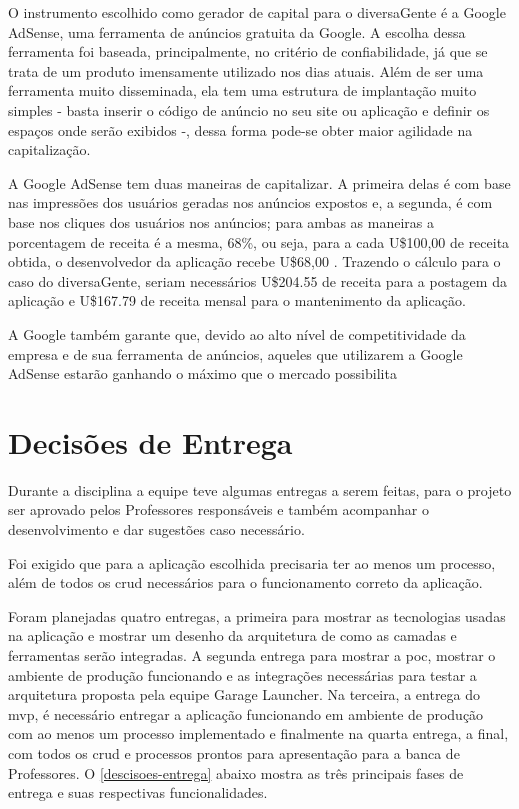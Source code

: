 O instrumento escolhido como gerador de capital para o diversaGente é a Google AdSense, uma ferramenta de anúncios gratuita da Google. A escolha dessa ferramenta foi baseada, principalmente, no critério de confiabilidade, já que se trata de um produto imensamente utilizado nos dias atuais. Além de ser uma ferramenta muito disseminada, ela tem uma estrutura de implantação muito simples - basta inserir o código de anúncio no seu site ou aplicação e definir os espaços onde serão exibidos -, dessa forma pode-se obter maior agilidade na capitalização.




A Google AdSense tem duas maneiras de capitalizar. A primeira delas é com base nas impressões dos usuários geradas nos anúncios expostos e, a segunda, é com base nos cliques dos usuários nos anúncios; para ambas as maneiras a porcentagem de receita é a mesma, 68\%, ou seja, para a cada U\$100,00 de receita obtida, o desenvolvedor da aplicação recebe U\$68,00  \cite{googleadsense}. Trazendo o cálculo para o caso do diversaGente, seriam necessários U\$204.55 de receita para a postagem da aplicação e U\$167.79 de receita mensal para o mantenimento da aplicação.

A Google também garante que, devido ao alto nível de competitividade da empresa e de sua ferramenta de anúncios, aqueles que utilizarem a Google AdSense estarão ganhando o máximo que o mercado possibilita


\section{Decisões de Entrega}

Durante a disciplina a equipe teve algumas entregas a serem feitas, para o projeto ser aprovado pelos Professores responsáveis e também acompanhar o desenvolvimento e dar sugestões caso necessário. 

Foi exigido que para a aplicação escolhida precisaria ter ao menos um processo, além de todos os \ac{crud} necessários para o funcionamento correto da aplicação. 

Foram planejadas quatro entregas, a primeira para mostrar as tecnologias usadas na aplicação e mostrar um desenho da arquitetura de como as camadas e ferramentas serão integradas. A segunda entrega para mostrar a \ac{poc}, mostrar o ambiente de produção funcionando e as integrações necessárias para testar a arquitetura proposta pela equipe Garage Launcher. Na terceira, a entrega do \ac{mvp}, é necessário entregar a aplicação funcionando em ambiente de produção com ao menos um processo implementado e finalmente na quarta entrega, a final, com todos os \ac{crud} e processos prontos para apresentação para a banca de Professores. O \autoref{descisoes-entrega} abaixo mostra as três principais fases de entrega e suas respectivas funcionalidades.

